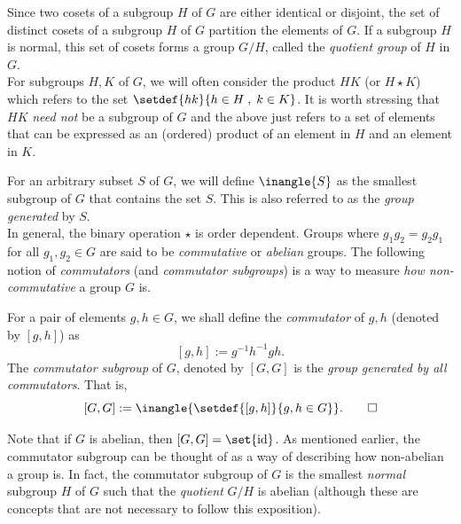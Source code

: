 \documentclass{toc}
\begin{document}
Since two cosets of a subgroup $H$ of $G$ are either identical or
disjoint, the set of distinct cosets of a subgroup $H$ of $G$
partition the elements of $G$. If a subgroup $H$ is normal, this set
of cosets forms a group $G/H$, called the \emph{quotient group} of $H$
in $G$.\\


%
For subgroups $H, K$ %
of $G$, we will often consider the product $HK$ (or $H \star K$) which refers to the set $\setdef{h k}{h \in H\;,\; k\in K}$. 
It is worth stressing that $HK$ \emph{need not} be a subgroup of $G$ and the above just refers to a set of elements that can be expressed as an (ordered) product of an element in $H$ and an element in $K$. 

For an arbitrary %
subset  %
$S$ of $G$, we will define $\inangle{S}$ as the smallest subgroup of $G$ that contains the set $S$. This is also referred to as the \emph{group generated} by $S$.\\


In general, the binary operation $\star$ is order dependent. Groups where $g_1 g_2 = g_2 g_1$ for all $g_1,g_2 \in G$ are said to be \emph{commutative} or \emph{abelian} groups. The following notion of \emph{commutators} (and \emph{commutator subgroups}) is a way to measure \emph{how non-commutative} a group $G$ is.

\begin{definition}[Commutators]\label{defn:commutator}
  For a pair of elements $g, h\in G$, we shall define the \emph{commutator} of $g,h$ (denoted by $[g,h]$) as
  \[
    [g,h] := g^{-1} h^{-1} g h. 
  \]
  The \emph{commutator subgroup} of $G$, denoted by $[G,G]$ is the \emph{group generated by all commutators}. That is,
  \[
    [G,G] := \inangle{\setdef{[g,h]}{g,h\in G}}.\qedhere
  \]
\end{definition}

Note that if $G$ is abelian, then $[G,G] = \set{\mathrm{id}}$. As mentioned earlier, the commutator subgroup can be thought of as a way of describing how non-abelian a group is. In fact, the commutator subgroup of $G$ is the smallest \emph{normal} subgroup $H$ of $G$ such that the \emph{quotient} $G/H$ is abelian (although these are concepts that are not necessary to follow this exposition).



%
%
%
%

%
%
\end{document}
